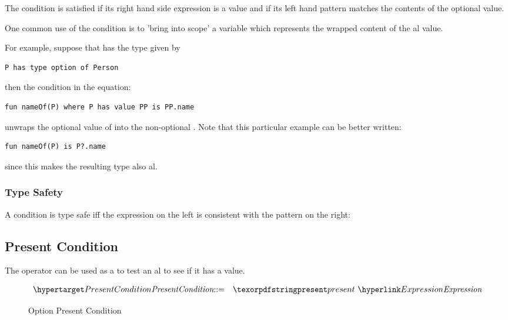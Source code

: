 The  condition is satisfied if its right hand side expression is a  value and if its left hand pattern matches the contents of the optional value.

One common use of the  condition is to 'bring into scope' a variable which represents the wrapped content of the al value.

For example, suppose that  has the type given by
\begin{lstlisting}
P has type option of Person
\end{lstlisting}
then the condition in the equation:
\begin{lstlisting}
fun nameOf(P) where P has value PP is PP.name
\end{lstlisting}
unwraps the optional value of  into the non-optional . Note that this particular example can be better written:
\begin{lstlisting}
fun nameOf(P) is P?.name
\end{lstlisting}
since this makes the resulting type also al.

\subsubsection{Type Safety}
A  condition is type safe iff the expression on the left is consistent with the pattern on the right:
\begin{prooftree}
\end{prooftree}

\subsection{Present Condition}
\label{presentCond}

The  operator can be used as a  to test an al to see if it has a value.

\begin{figure}[htbp]
\begin{eqnarray*}
\ntDef{PresentCondition}&\arrow&\q{present}\ \ntRef{Expression}
\end{eqnarray*}
\caption{Option Present Condition}\label{optionPresentFig}
\end{figure}


